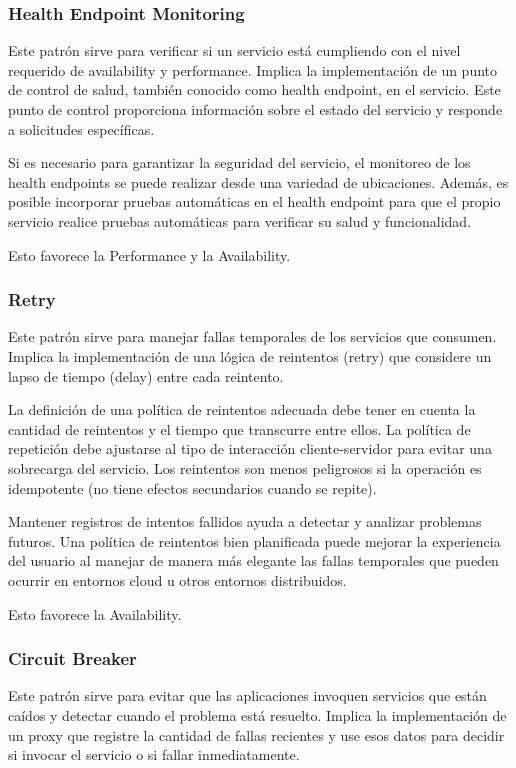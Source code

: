 \documentclass{article}
\begin{document}
		\subsubsection{Health Endpoint Monitoring}
		Este patrón sirve para verificar si un servicio está cumpliendo con el nivel requerido de availability y performance. Implica la implementación de un punto de control de salud, también conocido como health endpoint, en el servicio. Este punto de control proporciona información sobre el estado del servicio y responde a solicitudes específicas.
		
		Si es necesario para garantizar la seguridad del servicio, el monitoreo de los health endpoints se puede realizar desde una variedad de ubicaciones. Además, es posible incorporar pruebas automáticas en el health endpoint para que el propio servicio realice pruebas automáticas para verificar su salud y funcionalidad.
		
		
		Esto favorece la Performance y la Availability.
		
		\subsubsection{Retry} \label{sec:retry}
		Este patrón sirve para manejar fallas temporales de los servicios que consumen. Implica la implementación de una lógica de reintentos (retry) que considere un lapso de tiempo (delay) entre cada reintento.
		
		La definición de una política de reintentos adecuada debe tener en cuenta la cantidad de reintentos y el tiempo que transcurre entre ellos. La política de repetición debe ajustarse al tipo de interacción cliente-servidor para evitar una sobrecarga del servicio. Los reintentos son menos peligrosos si la operación es idempotente (no tiene efectos secundarios cuando se repite).
		
		Mantener registros de intentos fallidos ayuda a detectar y analizar problemas futuros. Una política de reintentos bien planificada puede mejorar la experiencia del usuario al manejar de manera más elegante las fallas temporales que pueden ocurrir en entornos cloud u otros entornos distribuidos.
		
		
		Esto favorece la Availability.
		
		\subsubsection{Circuit Breaker}\label{sec:circuit_breaker}
		Este patrón sirve para evitar que las aplicaciones invoquen servicios que están caídos y detectar cuando el problema está resuelto. Implica la implementación de un proxy que registre la	cantidad de fallas recientes y use esos	datos para decidir si invocar el servicio o	si fallar inmediatamente.
		
\end{document}
